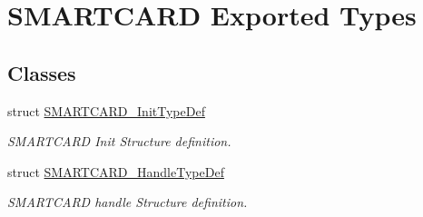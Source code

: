 \hypertarget{group___s_m_a_r_t_c_a_r_d___exported___types}{}\section{S\+M\+A\+R\+T\+C\+A\+RD Exported Types}
\label{group___s_m_a_r_t_c_a_r_d___exported___types}
\subsection*{Classes}
\begin{DoxyCompactItemize}
\item 
struct \hyperlink{struct_s_m_a_r_t_c_a_r_d___init_type_def}{S\+M\+A\+R\+T\+C\+A\+R\+D\+\_\+\+Init\+Type\+Def}
\begin{DoxyCompactList}\small\item\em S\+M\+A\+R\+T\+C\+A\+RD Init Structure definition. \end{DoxyCompactList}\item 
struct \hyperlink{struct_s_m_a_r_t_c_a_r_d___handle_type_def}{S\+M\+A\+R\+T\+C\+A\+R\+D\+\_\+\+Handle\+Type\+Def}
\begin{DoxyCompactList}\small\item\em S\+M\+A\+R\+T\+C\+A\+RD handle Structure definition. \end{DoxyCompactList}\end{DoxyCompactItemize}
